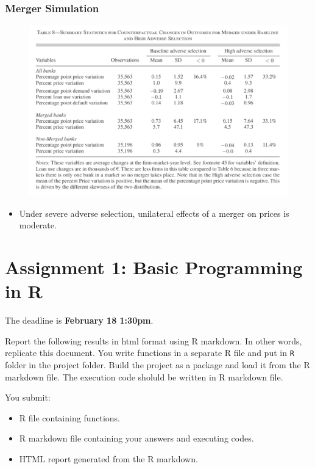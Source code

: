 \documentclass[]{book}
\providecommand{\tightlist}{%
  \setlength{\itemsep}{0pt}\setlength{\parskip}{0pt}}
\begin{document}
\subsection{Merger Simulation}\label{merger-simulation-2}

\begin{figure}
\centering
\includegraphics{figuretable/Crawford_2018_Table8.png}
\caption{}
\end{figure}

\begin{itemize}
\tightlist
\item
  Under severe adverse selection, unilateral effects of a merger on
  prices is moderate.
\end{itemize}

\chapter{Assignment 1: Basic Programming in R}\label{assignment1}

The deadline is \textbf{February 18 1:30pm}.

Report the following results in html format using R markdown. In other
words, replicate this document. You write functions in a separate R file
and put in \texttt{R} folder in the project folder. Build the project as
a package and load it from the R markdown file. The execution code
sholuld be written in R markdown file.

You submit:

\begin{itemize}
\tightlist
\item
  R file containing functions.
\item
  R markdown file containing your answers and executing codes.
\item
  HTML report generated from the R markdown.
\end{itemize}
\end{document}
